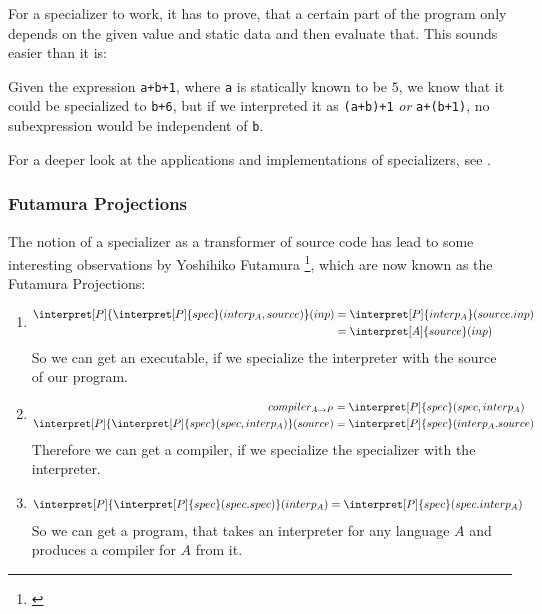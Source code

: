For a specializer to work, it has to prove, that a certain part of the 
program only depends on the given value and static data and then evaluate 
that. This sounds easier than it is: 
\begin{example}
	Given the expression {\tt a+b+1}, where {\tt a} is statically known to be $5$, 
	we know that it could be specialized to {\tt b+6}, but if we interpreted it 
	as {\tt (a+b)+1} {\em or} {\tt a+(b+1)}, no subexpression would be
	independent of {\tt b}.
\end{example}
For a deeper look at the applications and implementations of specializers, 
see \cite{jones1993partial}.

\subsubsection{Futamura Projections} %
\label{ssub:Futamura Projections}
The notion of a specializer as a transformer of source code has lead to some 
interesting observations by Yoshihiko Futamura
\footnote{\cite{futamura1999partial}}, which are now known as the Futamura
Projections:

\begin{enumerate}
	\item \begin{align*}
			\interpret[P]{\interpret[P]{spec}(interp_A, source)}(inp)
			&= \interpret[P]{interp_A}(source.inp) \\
			&= \interpret[A]{source}(inp)
	\end{align*}
		So we can get an executable, if we specialize the interpreter with the 
		source of our program.
	\item \begin{equation*}
			\begin{split}
			compiler_{A\rightarrow P} &= \interpret[P]{spec}(spec, interp_A) \\
			\interpret[P]{\interpret[P]{spec}(spec, interp_A)}(source)
			&= \interpret[P]{spec}(interp_A.source)
		\end{split}
	\end{equation*}
		Therefore we can get a compiler, if we specialize the specializer with the interpreter.
	\item \begin{align*}
			\interpret[P]{\interpret[P]{spec}(spec.spec)}(interp_A)
			&= \interpret[P]{spec}(spec.interp_A)
	\end{align*}
		So we can get a program, that takes an interpreter for any language $A$ 
		and produces a compiler for $A$ from it.
\end{enumerate}

